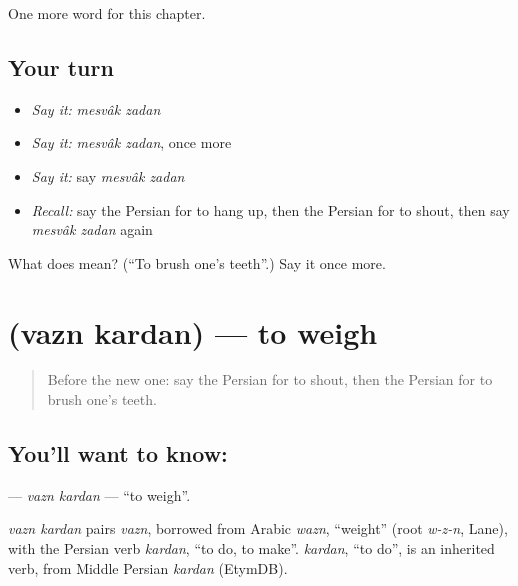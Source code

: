 \begin{grammarlens}[title={What you've built}]
One more word for this chapter.
\end{grammarlens}

\subsection*{Your turn}
\begin{itemize}
\raggedright
  \item \emph{Say it:} \emph{mesvâk zadan}
  \item \emph{Say it:} \emph{mesvâk zadan}, once more
  \item \emph{Say it:} say \emph{mesvâk zadan}
  \item \emph{Recall:} say the Persian for to hang up, then the Persian for to shout, then say \emph{mesvâk zadan} again
\end{itemize}

\begin{tcolorbox}[breakable,colback=teal!4,colframe=teal!35!black,title={Before you move on}]
What does   mean? (\textquotedblleft{}To brush one's teeth\textquotedblright{}.) Say it once more.
\end{tcolorbox}
\section[\texorpdfstring{\fa{وزن} \fa{کردن} (vazn kardan)}{وزن کردن (vazn kardan)}]{  (vazn kardan) — to weigh}

\label{lesson:FA-C255-vazn-kardan}



\begin{quote}
Before the new one: say the Persian for to shout, then the Persian for to brush one's teeth.
\end{quote}

\subsection*{You'll want to know:  }
\textbf{ } — \emph{vazn kardan} — \textquotedblleft{}to weigh\textquotedblright{}.

\begin{cousinweb}
\emph{vazn kardan} pairs \emph{vazn}, borrowed from Arabic \emph{wazn}, \textquotedblleft{}weight\textquotedblright{} (root \emph{w-z-n}, Lane), with the Persian verb \emph{kardan}, \textquotedblleft{}to do, to make\textquotedblright{}. \emph{kardan}, \textquotedblleft{}to do\textquotedblright{}, is an inherited verb, from Middle Persian \emph{kardan} (EtymDB).
\end{cousinweb}

